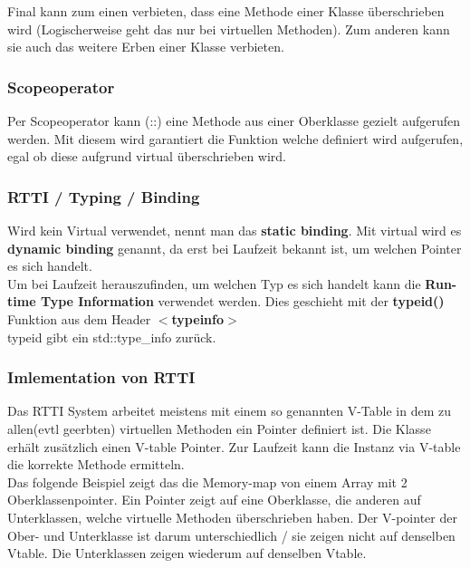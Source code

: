 Final kann zum einen verbieten, dass eine Methode einer Klasse überschrieben wird
(Logischerweise geht das nur bei virtuellen Methoden). 
Zum anderen kann sie auch das weitere Erben einer Klasse verbieten. 

\subsubsection{Scopeoperator}

Per Scopeoperator kann (::) eine Methode aus einer Oberklasse gezielt aufgerufen werden. 
Mit diesem wird garantiert die Funktion welche definiert wird aufgerufen, egal ob diese aufgrund virtual überschrieben wird. 



\subsubsection{RTTI / Typing / Binding}

Wird kein Virtual verwendet, nennt man das \textbf{static binding}. 
Mit virtual wird es \textbf{dynamic binding} genannt, da erst bei Laufzeit bekannt ist, um welchen Pointer es sich handelt.\\
Um bei Laufzeit herauszufinden, um welchen Typ es sich handelt kann die \textbf{Run-time Type Information} verwendet werden. 
Dies geschieht mit der \textbf{typeid()} Funktion aus dem Header \textbf{$<$typeinfo$>$}\\
typeid gibt ein std::type\_info zurück. 



\subsubsection{Imlementation von RTTI}

Das RTTI System arbeitet meistens mit einem so genannten V-Table in dem zu allen(evtl geerbten) virtuellen Methoden ein Pointer definiert ist. 
Die Klasse erhält zusätzlich einen V-table Pointer. 
Zur Laufzeit kann die Instanz via V-table die korrekte Methode ermitteln.\\

Das folgende Beispiel zeigt das die Memory-map von einem Array mit 2 Oberklassenpointer. 
Ein Pointer zeigt auf eine Oberklasse, die anderen auf Unterklassen, welche virtuelle Methoden überschrieben haben. 
Der V-pointer der Ober- und Unterklasse ist darum unterschiedlich / sie zeigen nicht auf denselben Vtable. 
Die Unterklassen zeigen wiederum auf denselben Vtable.  

